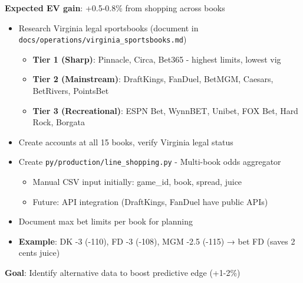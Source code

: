 \textbf{Expected EV gain}: +0.5-0.8\% from shopping across books

\begin{itemize}
  \item {} Research Virginia legal sportsbooks (document in \texttt{docs/operations/virginia\_sportsbooks.md})
  \begin{itemize}
    \item \textbf{Tier 1 (Sharp)}: Pinnacle, Circa, Bet365 - highest limits, lowest vig
    \item \textbf{Tier 2 (Mainstream)}: DraftKings, FanDuel, BetMGM, Caesars, BetRivers, PointsBet
    \item \textbf{Tier 3 (Recreational)}: ESPN Bet, WynnBET, Unibet, FOX Bet, Hard Rock, Borgata
  \end{itemize}
  \item {} Create accounts at all 15 books, verify Virginia legal status
  \item {} Create \texttt{py/production/line\_shopping.py} - Multi-book odds aggregator
  \begin{itemize}
    \item Manual CSV input initially: game\_id, book, spread, juice
    \item Future: API integration (DraftKings, FanDuel have public APIs)
  \end{itemize}
  \item {} Document max bet limits per book for planning
  \item \textbf{Example}: DK -3 (-110), FD -3 (-108), MGM -2.5 (-115) → bet FD (saves 2 cents juice)
\end{itemize}

\textbf{Goal}: Identify alternative data to boost predictive edge (+1-2\%)

